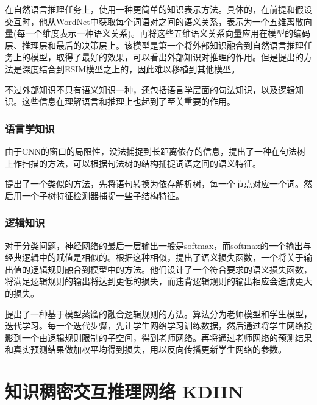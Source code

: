 \documentclass[UTF8,11pt,a4paper,nofonts]{ctexart}
\begin{document}
在自然语言推理任务上，\cite{Chen2017NaturalLI}使用一种更简单的知识表示方法。具体的，在前提和假设交互时，他从WordNet中获取每个词语对之间的语义关系，表示为一个五维离散向量(每一个维度表示一种语义关系)。再将这些五维语义关系向量应用在模型的编码层、推理层和最后的决策层上。该模型是第一个将外部知识融合到自然语言推理任务上的模型，取得了最好的效果，可以看出外部知识对推理的作用。但是\cite{Chen2017NaturalLI}提出的方法是深度结合到ESIM模型之上的，因此难以移植到其他模型。

不过外部知识不只有语义知识一种，还包括语言学层面的句法知识，以及逻辑知识。这些信息在理解语言和推理上也起到了至关重要的作用。

\subsubsection{语言学知识}

由于CNN的窗口的局限性，没法捕捉到长距离依存的信息，\cite{Ma2015DependencybasedCN}提出了一种在句法树上作扫描的方法，可以根据句法树的结构捕捉词语之间的语义特征。

\cite{Mou2016NaturalLI}提出了一个类似的方法，先将语句转换为依存解析树，每一个节点对应一个词。然后用一个子树特征检测器捕捉一些子结构特征。

\subsubsection{逻辑知识}

对于分类问题，神经网络的最后一层输出一般是softmax，而softmax的一个输出与经典逻辑中的赋值是相似的。根据这种相似，\cite{Xu2017ASL}提出了语义损失函数，一个将关于输出值的逻辑规则融合到模型中的方法。他们设计了一个符合要求的语义损失函数，将满足逻辑规则的输出将达到更低的损失，而违背逻辑规则的输出相应会造成更大的损失。

\cite{Hu2016HarnessingDN, Hu2016DeepNN}提出了一种基于模型蒸馏的融合逻辑规则的方法。算法分为老师模型和学生模型，迭代学习。每一个迭代步骤，先让学生网络学习训练数据，然后通过将学生网络投影到一个由逻辑规则限制的子空间，得到老师网络。再将通过老师网络的预测结果和真实预测结果做加权平均得到损失，用以反向传播更新学生网络的参数。






\newpage
\section{知识稠密交互推理网络 KDIIN}
\end{document}
